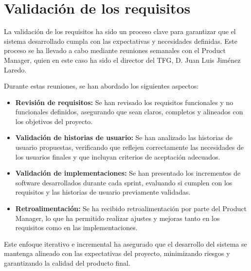 \section{Validación de los requisitos}

La validación de los requisitos ha sido un proceso clave para garantizar que el sistema desarrollado cumpla con las expectativas y necesidades definidas. Este proceso se ha llevado a cabo mediante reuniones semanales con el Product Manager, quien en este caso ha sido el director del TFG, D. Juan Luis Jiménez Laredo.

Durante estas reuniones, se han abordado los siguientes aspectos:

\begin{itemize}
    \item \textbf{Revisión de requisitos:} Se han revisado los requisitos funcionales y no funcionales definidos, asegurando que sean claros, completos y alineados con los objetivos del proyecto.
    \item \textbf{Validación de historias de usuario:} Se han analizado las historias de usuario propuestas, verificando que reflejen correctamente las necesidades de los usuarios finales y que incluyan criterios de aceptación adecuados.
    \item \textbf{Validación de implementaciones:} Se han presentado los incrementos de software desarrollados durante cada sprint, evaluando si cumplen con los requisitos y las historias de usuario previamente validadas.
    \item \textbf{Retroalimentación:} Se ha recibido retroalimentación por parte del Product Manager, lo que ha permitido realizar ajustes y mejoras tanto en los requisitos como en las implementaciones.
\end{itemize}

Este enfoque iterativo e incremental ha asegurado que el desarrollo del sistema se mantenga alineado con las expectativas del proyecto, minimizando riesgos y garantizando la calidad del producto final.
